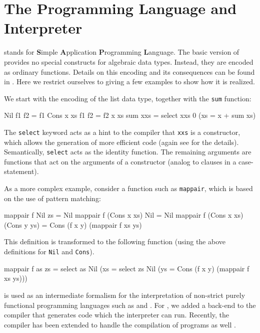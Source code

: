 \section{The \Sapl Programming Language and Interpreter}
\label{sapljs:sec:sapl}
\Sapl stands for \textbf{S}imple \textbf{A}pplication \textbf{P}rogramming
\textbf{L}anguage. The basic version of \Sapl provides no special constructs for
algebraic data types. Instead, they are encoded as ordinary functions.  Details 
on this encoding and its consequences can be found in \cite{JKP}.
Here we restrict ourselves to giving a few examples to show how it is realized.

We start with the encoding of the list data type, together with the \texttt{sum} function:
\begin{CleanCode}
Nil       f1  f2 = f1
Cons x xs f1  f2 = f2 x xs
sum          xxs = select xxs 0 (\x xs = x + sum xs)
\end{CleanCode}

The \texttt{select} keyword acts as a hint to the compiler that \texttt{xxs} is 
a constructor, which allows the generation of more efficient code (again see
\cite{JKP} for the details). Semantically, \texttt{select} acts as the identity
function. The remaining arguments are functions that act on the arguments of a
constructor (analog to clauses in a case-statement).

As a more complex example, consider a \Haskell function such as
\texttt{mappair}, which is based on the use of pattern matching:
  
\begin{CleanCode}
mappair f Nil          zs           = Nil 
mappair f (Cons x xs)  Nil          = Nil 
mappair f (Cons x xs)  (Cons y ys)  = Cons (f x y) (mappair f xs ys) 
\end{CleanCode}
This definition is transformed to the following \Sapl function (using the
above definitions for \texttt{Nil} and \texttt{Cons}).
\begin{CleanCode}
mappair f as zs 
= select as Nil (\x xs = select zs Nil (\y ys = Cons (f x y) (mappair f xs ys)))
\end{CleanCode}
%
\Sapl is used as an intermediate formalism for the interpretation of non-strict
purely functional programming languages such as \Haskell and \Clean. For \Clean,
we added a \Sapl back-end to the \Clean compiler that generates \Sapl code which
the interpreter can run. Recently, the \Clean compiler has been extended to
handle the compilation of \Haskell programs as well \cite{HASCLEAN}.


